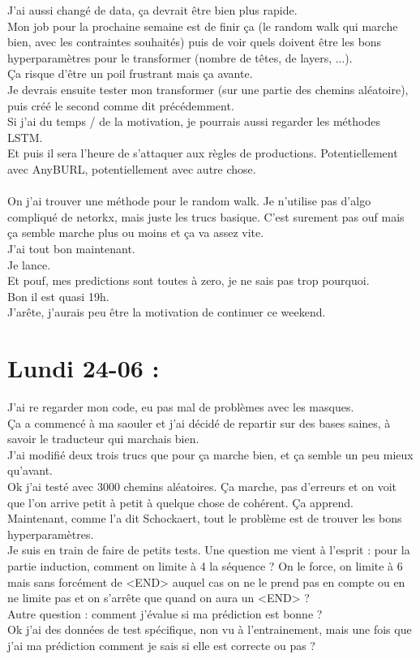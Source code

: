 \documentclass{article}
\begin{document}
J'ai aussi changé de data, ça devrait être bien plus rapide.\\
Mon job pour la prochaine semaine est de finir ça (le random walk qui marche bien, avec les contraintes souhaités) puis de voir quels doivent être les bons hyperparamètres pour le transformer (nombre de têtes, de layers, ...).\\
Ça risque d'être un poil frustrant mais ça avante.\\
Je devrais ensuite tester mon transformer (sur une partie des chemins aléatoire), puis créé le second comme dit précédemment.\\
Si j'ai du temps / de la motivation, je pourrais aussi regarder les méthodes LSTM.\\
Et puis il sera l'heure de s'attaquer aux règles de productions. Potentiellement avec AnyBURL, potentiellement avec autre chose.\\
\\
On j'ai trouver une méthode pour le random walk. Je n'utilise pas d'algo compliqué de netorkx, mais juste les trucs basique. C'est surement pas ouf mais ça semble marche plus ou moins et ça va assez vite.\\
J'ai tout bon maintenant.\\
Je lance.\\
Et pouf, mes predictions sont toutes à zero, je ne sais pas trop pourquoi.\\
Bon il est quasi 19h.\\
J'arête, j'aurais peu être la motivation de continuer ce weekend.\\
\section*{Lundi 24-06 :}
J'ai re regarder mon code, eu pas mal de problèmes avec les masques.\\
Ça a commencé à ma saouler et j'ai décidé de repartir sur des bases saines, à savoir le traducteur qui marchais bien.\\
J'ai modifié deux trois trucs que pour ça marche bien, et ça semble un peu mieux qu'avant.\\
Ok j'ai testé avec 3000 chemins aléatoires. Ça marche, pas d'erreurs et on voit que l'on arrive petit à petit à quelque chose de cohérent. Ça apprend.\\
Maintenant, comme l'a dit Schockaert, tout le problème est de trouver les bons hyperparamètres.\\
Je suis en train de faire de petits tests. Une question me vient à l'esprit : pour la partie induction, comment on limite à 4 la séquence ? On le force, on limite à 6 mais sans forcément de <END> auquel cas on ne le prend pas en compte ou en ne limite pas et on s'arrête que quand on aura un <END> ?\\
Autre question : comment j'évalue si ma prédiction est bonne ?\\
Ok j'ai des données de test spécifique, non vu à l'entrainement, mais une fois que j'ai ma prédiction comment je sais si elle est correcte ou pas ?\\
\end{document}
